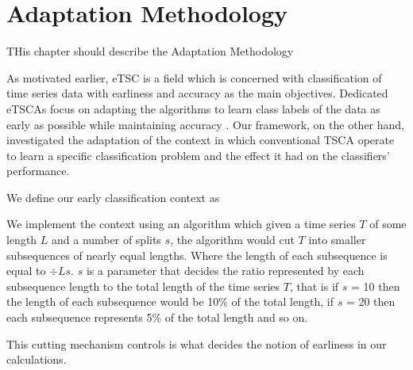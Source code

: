 \chapter{Adaptation Methodology}
\label{ChapterAdaptationMethodology}
THis chapter should describe the Adaptation Methodology

%
As motivated earlier, eTSC is a field which is concerned with classification of time series data with earliness and accuracy
as the main objectives. Dedicated eTSCAs focus on adapting the algorithms to learn class labels of the data as early as possible
while maintaining accuracy \cite{mori2017early}.
Our framework, on the other hand, investigated the adaptation of the context in which conventional TSCA operate to learn a specific
classification problem and the effect it had on the classifiers' performance.

We define our early classification context as

We implement the context using an algorithm which given a time series $T$ of some length $L$ and a number of splits $s$,
the algorithm would cut $T$ into smaller subsequences of nearly equal lengths. Where the length of each subsequence is equal to $\div{L}{s}$.
$s$ is a parameter that decides the ratio represented by each subsequence length to the total length of the time series $T$,
that is if $s$ = 10 then the length of each subsequence would be 10\% of the total length, if $s$ = 20 then each subsequence
represents 5\% of the total length and so on.

This cutting mechanism controls is what decides the notion of earliness in our calculations.
